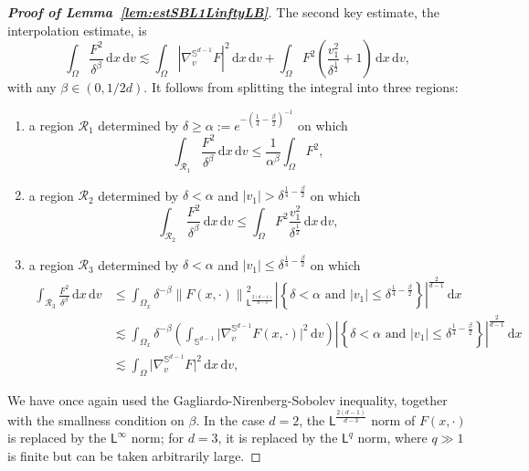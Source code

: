 \documentclass[11pt]{amsart}
\theoremstyle{definition}
\theoremstyle{remark}
\numberwithin{equation}{section}
\newcommand{\dd}{{\, \mathrm d}}
\newcommand{\sfL}{\mathsf{L}}
\begin{document}
\begin{proof}[{\bf Proof of Lemma~\ref{lem:estSBL1LinftyLB}}]
  The second key estimate, the interpolation estimate, is 
  \begin{equation*}
    \int_{\Omega} \frac{F^2 }{\delta^{\beta}} \dd x \dd v\lesssim
    \int_\Omega |\nabla_v^{\mathbb{S}^{d-1}} F|^2  \dd x \dd v + \int_\Omega F^2 \left(  \frac{v_1^2 }{\delta^{\frac{1}{2}} } + 1\right) \dd x \dd v,
  \end{equation*}
  with any $\beta \in (0,1/2d)$. It follows from splitting the integral into three regions:
  \begin{enumerate}
    \item a region $\mathcal{R}_1$ determined by $\delta \ge \alpha := e^{-(\frac{1}{4}-\frac{\beta}{2})^{-1}}$ on which
      \begin{equation*}
        \int_{\mathcal{R}_1} \frac{F^2}{\delta^{\beta}} \dd x \dd v \le \frac{1}{\alpha^\beta} \int_{\Omega} F^2,
      \end{equation*}
    \item a region $\mathcal{R}_2$ determined by $\delta < \alpha$ and $|v_1| > \delta^{\frac{1}{4}-\frac{\beta}{2}}$ on which
      \begin{equation*}
        \int_{\mathcal{R}_2}  \frac{F^2}{\delta^{\beta}} \dd x \dd v \le \int_{\Omega} F^2 \frac{v_1^2}{\delta^{\frac{1}{2}}} \dd x \dd v,
      \end{equation*}
    \item a region $\mathcal{R}_3$ determined by $\delta < \alpha$ and $|v_1| \le \delta^{\frac{1}{4}-\frac{\beta}{2}}$ on which
      \begin{align*}
        \int_{\mathcal{R}_3} \frac{F^2}{\delta^{\beta}} \dd x \dd v
        & \le \int_{\Omega_x}  \delta^{-\beta} \left\| F(x,\cdot) \right\|_{\sfL^{\frac{2(d-1)}{d-3}}}^2 %
          \left| \left\{ \delta < 
          \alpha\text{ and } |v_1| \le \delta^{\frac{1}{4}-\frac{\beta}{2}} \right\} \right|^{\frac{2}{d-1}} \dd x\\
        & \lesssim \int_{\Omega_x}  \delta^{-\beta} \left( \int_{\mathbb S^{d-1}} \big|\nabla_v ^{\mathbb S^{d-1}} F(x,\cdot) \big|^2 \dd v \right) \left| \left\{ \delta < \alpha \text{ and } |v_1| \le \delta^{\frac{1}{4}-\frac{\beta}{2}} \right\} \right|^{\frac{2}{d-1}} \dd x \\
        & \lesssim \int_{\Omega}  \big|\nabla_v ^{\mathbb S^{d-1}}F\big|^2 \dd x \dd v,
      \end{align*}
    \end{enumerate}
    We have once again used the Gagliardo-Nirenberg-Sobolev inequality, together with the smallness condition on $\beta$. In the case $d=2$, the $\sfL^{\frac{2(d-1)}{d-3}}$ norm of $F(x,\cdot)$ is replaced by the $\sfL^\infty$ norm; for $d=3$, it is replaced by the $\sfL^q$ norm, where $q \gg 1$ is finite but can be taken arbitrarily large. 
  

\end{proof}
\end{document}
